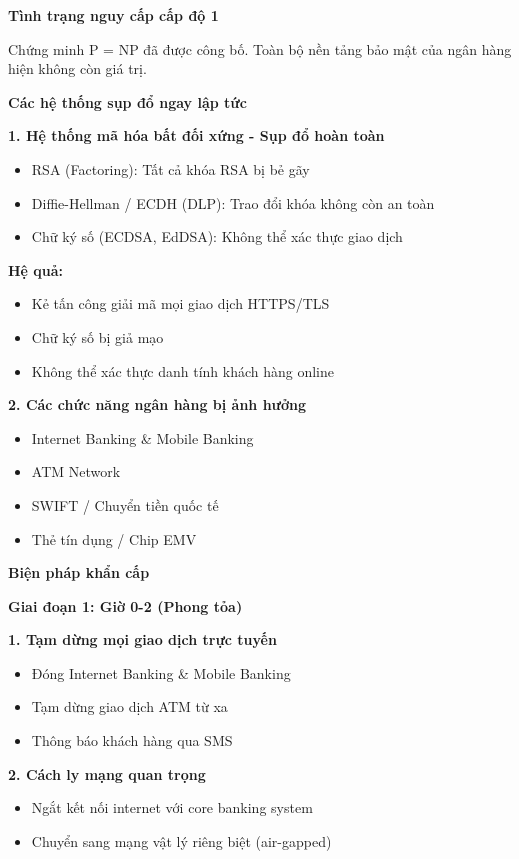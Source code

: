 \textbf{Tình trạng nguy cấp cấp độ 1}

Chứng minh P = NP đã được công bố. Toàn bộ nền tảng bảo mật của ngân hàng hiện không còn giá trị.

\textbf{Các hệ thống sụp đổ ngay lập tức}

\textbf{1. Hệ thống mã hóa bất đối xứng - Sụp đổ hoàn toàn}
\begin{itemize}
    \item RSA (Factoring): Tất cả khóa RSA bị bẻ gãy
    \item Diffie-Hellman / ECDH (DLP): Trao đổi khóa không còn an toàn
    \item Chữ ký số (ECDSA, EdDSA): Không thể xác thực giao dịch
\end{itemize}

\textbf{Hệ quả:}
\begin{itemize}
    \item Kẻ tấn công giải mã mọi giao dịch HTTPS/TLS
    \item Chữ ký số bị giả mạo
    \item Không thể xác thực danh tính khách hàng online
\end{itemize}

\textbf{2. Các chức năng ngân hàng bị ảnh hưởng}
\begin{itemize}
    \item Internet Banking \& Mobile Banking
    \item ATM Network
    \item SWIFT / Chuyển tiền quốc tế
    \item Thẻ tín dụng / Chip EMV
\end{itemize}

\textbf{Biện pháp khẩn cấp}

\textbf{Giai đoạn 1: Giờ 0-2 (Phong tỏa)}

\textbf{1. Tạm dừng mọi giao dịch trực tuyến}
\begin{itemize}
    \item Đóng Internet Banking \& Mobile Banking
    \item Tạm dừng giao dịch ATM từ xa
    \item Thông báo khách hàng qua SMS
\end{itemize}

\textbf{2. Cách ly mạng quan trọng}
\begin{itemize}
    \item Ngắt kết nối internet với core banking system
    \item Chuyển sang mạng vật lý riêng biệt (air-gapped)
\end{itemize}

